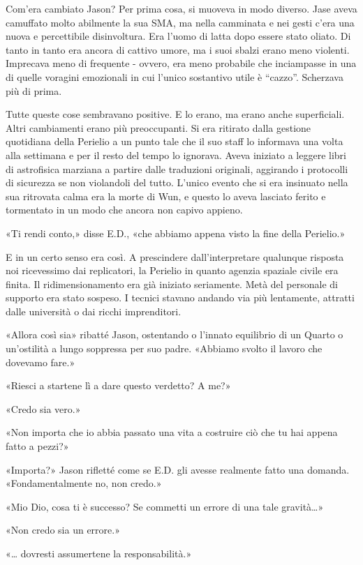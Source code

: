 Com'era cambiato Jason? Per prima cosa, si muoveva in modo diverso. Jase
aveva camuffato molto abilmente la sua SMA, ma nella camminata e nei
gesti c'era una nuova e percettibile disinvoltura. Era l'uomo di latta
dopo essere stato oliato. Di tanto in tanto era ancora di cattivo umore,
ma i suoi sbalzi erano meno violenti. Imprecava meno di frequente -
ovvero, era meno probabile che inciampasse in una di quelle voragini
emozionali in cui l'unico sostantivo utile è ``cazzo''. Scherzava più di
prima.

Tutte queste cose sembravano positive. E lo erano, ma erano anche
superficiali. Altri cambiamenti erano più preoccupanti. Si era ritirato
dalla gestione quotidiana della Perielio a un punto tale che il suo
staff lo informava una volta alla settimana e per il resto del tempo lo
ignorava. Aveva iniziato a leggere libri di astrofisica marziana a
partire dalle traduzioni originali, aggirando i protocolli di sicurezza
se non violandoli del tutto. L'unico evento che si era insinuato nella
sua ritrovata calma era la morte di Wun, e questo lo aveva lasciato
ferito e tormentato in un modo che ancora non capivo appieno.

«Ti rendi conto,» disse E.D., «che abbiamo appena visto la fine della
Perielio.»

E in un certo senso era così. A prescindere dall'interpretare qualunque
risposta noi ricevessimo dai replicatori, la Perielio in quanto agenzia
spaziale civile era finita. Il ridimensionamento era già iniziato
seriamente. Metà del personale di supporto era stato sospeso. I tecnici
stavano andando via più lentamente, attratti dalle università o dai
ricchi imprenditori.

«Allora così sia» ribatté Jason, ostentando o l'innato equilibrio di un
Quarto o un'ostilità a lungo soppressa per suo padre. «Abbiamo svolto il
lavoro che dovevamo fare.»

«Riesci a startene lì a dare questo verdetto? A me?»

«Credo sia vero.»

«Non importa che io abbia passato una vita a costruire ciò che tu hai
appena fatto a pezzi?»

«Importa?» Jason rifletté come se E.D. gli avesse realmente fatto una
domanda. «Fondamentalmente no, non credo.»

«Mio Dio, cosa ti è successo? Se commetti un errore di una tale
gravità\ldots»

«Non credo sia un errore.»

«\ldots{} dovresti assumertene la responsabilità.»

